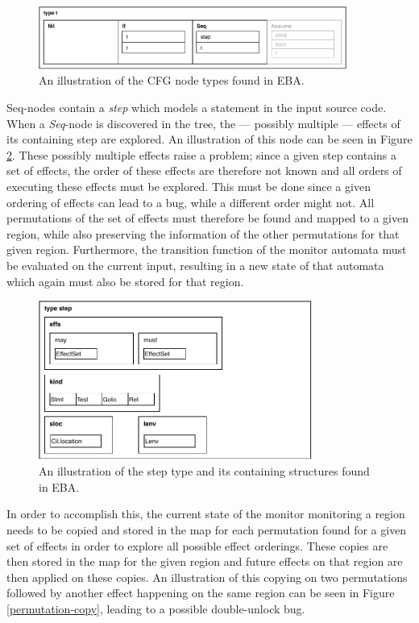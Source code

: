 \begin{figure}[H]
    \centering
    \includegraphics[width=0.9\textwidth]{implementation/figures/node}
    \caption{An illustration of the CFG node types found in EBA.}
    \label{cfg-nodes}
\end{figure}

\noindent Seq-nodes contain a \textit{step} which models a statement in the input source code. When a \textit{Seq}-node is discovered in the tree, the --- possibly multiple --- effects of its containing step are explored. An illustration of this node can be seen in Figure \ref{cfg-step}. These possibly multiple effects raise a problem; since a given step contains a set of effects, the order of these effects are therefore not known and all orders of executing these effects must be explored. This must be done since a given ordering of effects can lead to a bug, while a different order might not. All permutations of the set of effects must therefore be found and mapped to a given region, while also preserving the information of the other permutations for that given region. Furthermore, the transition function of the monitor automata must be evaluated on the current input, resulting in a new state of that automata which again must also be stored for that region. 

\begin{figure}[H]
    \centering
    \includegraphics[width=0.8\textwidth]{implementation/figures/step}
    \caption{An illustration of the step type and its containing structures found in EBA.}
    \label{cfg-step}
\end{figure}

\noindent In order to accomplish this, the current state of the monitor monitoring a region needs to be copied and stored in the map for each permutation found for a given set of effects in order to explore all possible effect orderings. These copies are then stored in the map for the given region and future effects on that region are then applied on these copies. An illustration of this copying on two permutations followed by another effect happening on the same region can be seen in Figure \ref{permutation-copy}, leading to a possible double-unlock bug.


